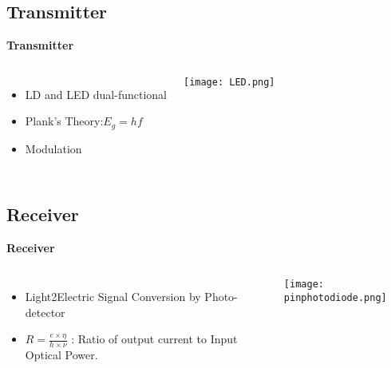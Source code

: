 \documentclass[9pt, dvipsnames]{beamer} %
\begin{document}
\subsection{Transmitter}

    \begin{frame}{\textbf {Transmitter}}
           \begin{columns}
          
             \begin{itemize}
              \item LD  and LED dual-functional
              \item Plank's Theory:$E_g=hf$
              \item Modulation
            \end{itemize}
           \texttt{[image: LED.png]}
          \end{columns}
   \end{frame}

\subsection{Receiver}
    \begin{frame}{\textbf {Receiver}}
           \begin{columns}
          
             \begin{itemize}
              \item Light2Electric Signal Conversion by Photo-detector 
              \item $R=\frac{e\times\eta}{h\times\nu}$ : Ratio of output current to Input Optical Power.
              
            \end{itemize}
           \texttt{[image: pinphotodiode.png]}
          \end{columns}
   \end{frame}
   
\end{document}

